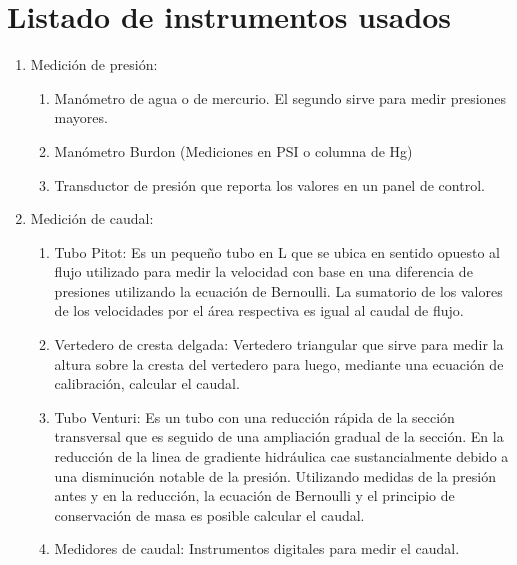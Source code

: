 \documentclass[12pt, a4paper]{exam}
\begin{document}
\section{Listado de instrumentos usados}
\begin{enumerate}
\item Medici\'on de presi\'on:
\begin{enumerate}
\item Man\'ometro de agua o de mercurio. El segundo sirve para medir presiones mayores.
\item Man\'ometro Burdon (Mediciones en PSI o columna de Hg)
\item Transductor de presi\'on que reporta los valores en un panel de control.
\end{enumerate}
\item Medici\'on de caudal:
\begin{enumerate}
\item Tubo Pitot: Es un peque\~no tubo en L que se ubica en sentido opuesto al flujo utilizado para medir la velocidad con base en una diferencia de presiones utilizando la ecuaci\'on de Bernoulli. La sumatorio de los valores de los velocidades por el \'area respectiva es igual al caudal de flujo. 
\item Vertedero de cresta delgada: Vertedero triangular que sirve para medir la altura sobre la cresta del vertedero para luego, mediante una ecuaci\'on de calibraci\'on, calcular el caudal.
\item Tubo Venturi: Es un tubo con una reducci\'on r\'apida de la secci\'on transversal que es seguido de una ampliaci\'on gradual de la secci\'on. En la reducci\'on de la linea de gradiente hidr\'aulica cae sustancialmente debido a una disminuci\'on notable de la presi\'on. Utilizando medidas de la presi\'on antes y en la reducci\'on, la ecuaci\'on de Bernoulli y el principio de conservaci\'on de masa es posible calcular el caudal.
\item Medidores de caudal: Instrumentos digitales para medir el caudal.
\end{enumerate}
\end{enumerate}
\end{document}
